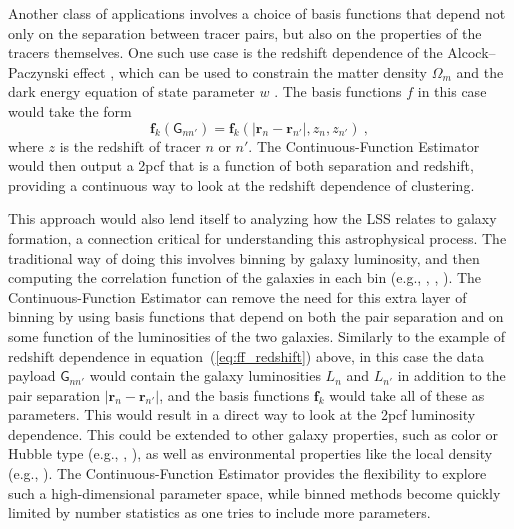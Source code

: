 \documentclass[modern]{aastex62}
\newcommand{\cf}{2pcf\xspace}
\newcommand{\Est}{The Continuous-Function Estimator\xspace}
\newcommand{\eqt}[1]{equation~(\ref{#1})}
\newcommand{\bld}[1]{\bm{#1}}
\newcommand{\ff}{\bld{f}}
\newcommand{\GG}[1]{\mathsf{G}_{#1}}
\begin{document}
Another class of applications involves a choice of basis functions that depend not only on the separation between tracer pairs, but also on the properties of the tracers themselves.
One such use case is the redshift dependence of the Alcock--Paczynski effect \citep{AlcockPaczynski1979}, which can be used to constrain the matter density $\Omega_m$ and the dark energy equation of state parameter $w$ \citep{Li2016}.
The basis functions $f$ in this case would take the form
\begin{equation}
    \label{eq:ff_redshift}
    \ff_k(\GG{n n'}) = \ff_k(|\bld{r}_n - \bld{r}_{n'}|, z_n, z_{n'}) ~,
\end{equation}
where $z$ is the redshift of tracer $n$ or $n'$.
\Est would then output a \cf that is a function of both separation and redshift, providing a continuous way to look at the redshift dependence of clustering.

This approach would also lend itself to analyzing how the LSS relates to galaxy formation, a connection critical for understanding this astrophysical process.
The traditional way of doing this involves binning by galaxy luminosity, and then computing the correlation function of the galaxies in each bin (e.g., \citealt{Budavari2003}, \citealt{Zehavi2011}, \citealt{Durkalec2018}).
\Est can remove the need for this extra layer of binning by using basis functions that depend on both the pair separation and on some function of the luminosities of the two galaxies.
Similarly to the example of redshift dependence in \eqt{eq:ff_redshift} above, in this case the data payload $\GG{n n'}$ would contain the galaxy luminosities $L_n$ and $L_{n'}$ in addition to the pair separation $|\bld{r}_n - \bld{r}_{n'}|$, and the basis functions $\ff_k$ would take all of these as parameters.
This would result in a direct way to look at the \cf luminosity dependence.
This could be extended to other galaxy properties, such as color or Hubble type (e.g., \citealt{Li2006}, \citealt{Skibba2014}), as well as environmental properties like the local density (e.g., \citealt{Abbas2006}).
\Est provides the flexibility to explore such a high-dimensional parameter space, while binned methods become quickly limited by number statistics as one tries to include more parameters.
\end{document}
